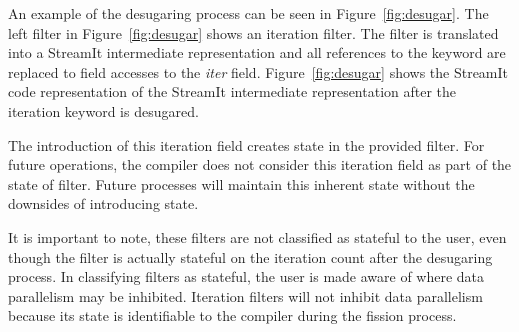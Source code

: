 An example of the desugaring process can be seen in Figure~\ref{fig:desugar}.  The left filter in Figure~\ref{fig:desugar} shows an iteration filter.  The filter is translated into a StreamIt intermediate representation and all references to the keyword are replaced to field accesses to the {\it iter} field. Figure~\ref{fig:desugar} shows the StreamIt code representation of the StreamIt intermediate representation after the iteration keyword is desugared.

The introduction of this iteration field creates state in the provided filter.  For future operations, the compiler does not consider this iteration field as part of the state of filter.  Future processes will maintain this inherent state without the downsides of introducing state.

It is important to note, these filters are not classified as stateful to the user, even though the filter is actually stateful on the iteration count after the desugaring process.  In classifying filters as stateful, the user is made aware of where data parallelism may be inhibited.  Iteration filters will not inhibit data parallelism because its state is identifiable to the compiler during the fission process.   
